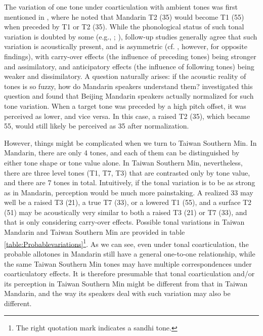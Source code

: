 The variation of one tone under coarticulation with ambient tones was first mentioned in \cite{Chao1968}, where he noted that Mandarin T2 (35) would become T1 (55) when preceded by T1 or T2 (35). While the phonological status of such tonal variation is doubted by some (e.g., \citealp{ShihSproat1992}; \citealp{Xu1994}), follow-up studies generally agree that such variation is acoustically present, and is asymmetric (cf. \citealp{Shen1990}, however, for opposite findings), with carry-over effects (the influence of preceding tones) being stronger and assimilatory, and anticipatory effects (the influence of following tones) being weaker and dissimilatory. A question naturally arises: if the acoustic reality of tones is so fuzzy, how do Mandarin speakers understand them? \cite{Xu1997} investigated this question and found that Beijing Mandarin speakers actually normalized for such tone variation. When a target tone was preceded by a high pitch offset, it was perceived as lower, and vice versa. In this case, a raised T2 (35), which became 55, would still likely be perceived as 35 after normalization.

However, things might be complicated when we turn to Taiwan Southern Min. In Mandarin, there are only 4 tones, and each of them can be distinguished by either tone shape or tone value alone. In Taiwan Southern Min, nevertheless, there are three level tones (T1, T7, T3) that are contrasted only by tone value, and there are 7 tones in total. Intuitively, if the tonal variation is to be as strong as in Mandarin, perception would be much more painstaking. A realized 33 may well be a raised T3 (21), a true T7 (33), or a lowered T1 (55), and a surface T2 (51) may be acoustically very similar to both a raised T3 (21) or T7 (33), and that is only considering carry-over effects. Possible tonal variations in Taiwan Mandarin and Taiwan Southern Min are provided in table \ref{table:Probablevariations}\footnote{The right quotation mark indicates a sandhi tone.}. As we can see, even under tonal coarticulation, the probable allotones in Mandarin still have a general one-to-one relationship, while the same Taiwan Southern Min tones may have multiple correspondences under coarticulatory effects. It is therefore presumable that tonal coarticulation and/or its perception in Taiwan Southern Min might be different from that in Taiwan Mandarin, and the way its speakers deal with such variation may also be different.

